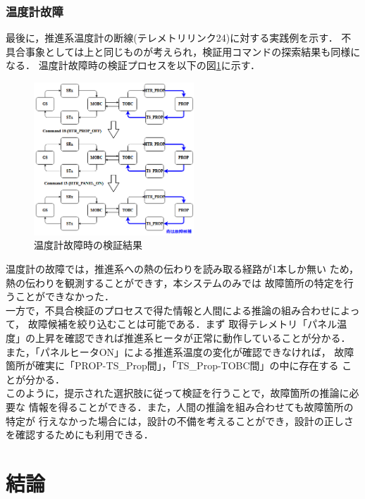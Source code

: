 \documentclass[11pt]{jsarticle}%
\begin{document}
\begin{multicols}{2}
\subsubsection{温度計故障}
最後に，推進系温度計の断線(テレメトリリンク24)に対する実践例を示す．
不具合事象としては上と同じものが考えられ，検証用コマンドの探索結果も同様になる．
温度計故障時の検証プロセスを以下の図\ref{fig:COM_phase_TS}に示す．
\begin{figure}[H]
  \centering
    \includegraphics[width=6.0cm]{../figure/COM_process_TS_fault.png}
    \caption{温度計故障時の検証結果}
    \label{fig:COM_phase_TS}
\end{figure}
温度計の故障では，推進系への熱の伝わりを読み取る経路が1本しか無い
ため，熱の伝わりを観測することができす，本システムのみでは
故障箇所の特定を行うことができなかった．\\
一方で，不具合検証のプロセスで得た情報と人間による推論の組み合わせによって，
故障候補を絞り込むことは可能である．まず
取得テレメトリ「パネル温度」の上昇を確認できれば推進系ヒータが正常に動作していることが分かる．
また，「パネルヒータON」による推進系温度の変化が確認できなければ，
故障箇所が確実に「PROP-TS\_Prop間」，「TS\_Prop-TOBC間」の中に存在する
ことが分かる．\\
このように，提示された選択肢に従って検証を行うことで，故障箇所の推論に必要な
情報を得ることができる．また，人間の推論を組み合わせても故障箇所の特定が
行えなかった場合には，設計の不備を考えることができ，設計の正しさを確認するためにも利用できる．
\vspace{-1zh}
\section{結論}
\vspace{-1zh}

\end{multicols}
\end{document}
